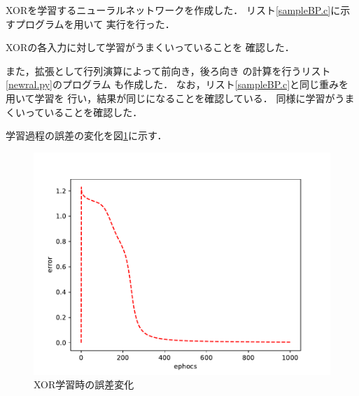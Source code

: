 XORを学習するニューラルネットワークを作成した．
リスト\ref{sampleBP.c}に示すプログラムを用いて
実行を行った．

XORの各入力に対して学習がうまくいっていることを
確認した．

また，拡張として行列演算によって前向き，後ろ向き
の計算を行うリスト\ref{newral.py}のプログラム
も作成した．
なお，リスト\ref{sampleBP.c}と同じ重みを用いて学習を
行い，結果が同じになることを確認している．
同様に学習がうまくいっていることを確認した．

学習過程の誤差の変化を図\ref{error-1}に示す．

\begin{figure}[htb]
  \centering
  \includegraphics[scale=0.5]{img/error1.pdf}
  \caption{XOR学習時の誤差変化}
  \label{error-1}
\end{figure}
